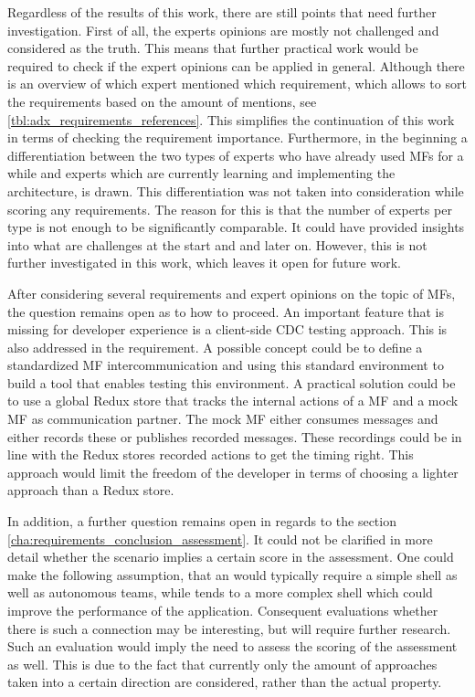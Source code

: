 Regardless of the results of this work, there are still points that need further investigation.
First of all, the experts opinions are mostly not challenged and considered as the truth.
This means that further practical work would be required to check if the expert opinions can be applied in general.
Although there is an overview of which expert mentioned which requirement, which allows to sort the requirements based on the amount of mentions, see \ref{tbl:adx_requirements_references}.
This simplifies the continuation of this work in terms of checking the requirement importance.
Furthermore, in the beginning a differentiation between the two types of experts who have already used \acp{MF} for a while and experts which are currently learning and implementing the architecture, is drawn.
This differentiation was not taken into consideration while scoring any requirements.
The reason for this is that the number of experts per type is not enough to be significantly comparable.
It could have provided insights into what are challenges at the start and and later on.
However, this is not further investigated in this work, which leaves it open for future work.

After considering several requirements and expert opinions on the topic of \acp{MF}, the question remains open as to how to proceed.
An important feature that is missing for developer experience is a client-side \ac{CDC} testing approach.
This is also addressed in the  requirement.
A possible concept could be to define a standardized \ac{MF} intercommunication and using this standard environment to build a tool that enables testing this environment.
A practical solution could be to use a global Redux store that tracks the internal actions of a \ac{MF} and a mock \ac{MF} as communication partner.
The mock \ac{MF} either consumes messages and either records these or publishes recorded messages.
These recordings could be in line with the Redux stores recorded actions to get the timing right.
This approach would limit the freedom of the developer in terms of choosing a lighter approach than a Redux store.

In addition, a further question remains open in regards to the section \ref{cha:requirements_conclusion_assessment}. It could not be clarified in more detail whether the scenario implies a certain score in the assessment.
One could make the following assumption, that an  would typically require a simple shell as well as autonomous teams, while  tends to a more complex shell which could improve the performance of the application.
Consequent evaluations whether there is such a connection may be interesting, but will require further research.
Such an evaluation would imply the need to assess the scoring of the assessment as well.
This is due to the fact that currently only the amount of approaches taken into a certain direction are considered, rather than the actual property.


